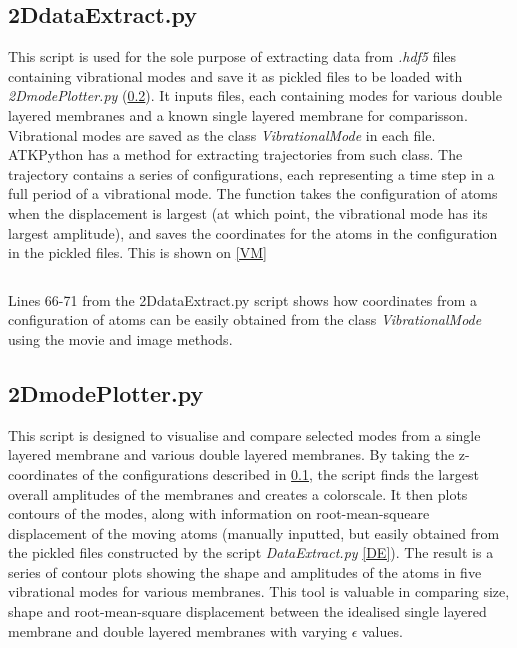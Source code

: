 \subsection{2DdataExtract.py}\label{2DE}
This script is used for the sole purpose of extracting data from \textit{.hdf5} files containing vibrational modes and save it as pickled files to be loaded with \textit{2DmodePlotter.py} (\cref{2DMP}). It inputs files, each containing modes for various double layered membranes and a known single layered membrane for comparisson. Vibrational modes are saved as the class \textit{VibrationalMode} in each file. ATKPython has a method for extracting trajectories from such class. The trajectory contains a series of configurations, each representing a time step in a full period of a vibrational mode. The function takes the configuration of atoms when the displacement is largest (at which point, the vibrational mode has its largest amplitude), and saves the coordinates for the atoms in the configuration in the pickled files. This is shown on \cref{VM}
\onecolumngrid

\begin{listing}[H]
 \inputminted[python3=true,bgcolor=Black,linenos=true,firstline=66,lastline=71]{python}{VNL/PythonScripts/Scripts/2DdataExtract.py}
 \caption{Lines 66-71 from the 2DdataExtract.py script shows how coordinates from a configuration of atoms can be easily obtained from the class \textit{VibrationalMode} using the movie and image methods.}
 \label{VM}
\end{listing}
\twocolumngrid
\subsection{2DmodePlotter.py}\label{2DMP}
This script is designed to visualise and compare selected modes from a single layered membrane and various double layered membranes. By taking the z-coordinates of the configurations described in \cref{2DE}, the script finds the largest overall amplitudes of the membranes and creates a colorscale. It then plots contours of the modes, along with information on root-mean-squeare displacement of the moving atoms (manually inputted, but easily obtained from the pickled files constructed by the script \textit{DataExtract.py} \cref{DE}). The result is a series of contour plots showing the shape and amplitudes of the atoms in five vibrational modes for various membranes. This tool is valuable in comparing size, shape and root-mean-square displacement between the idealised single layered membrane and double layered membranes with varying $\epsilon$ values.
